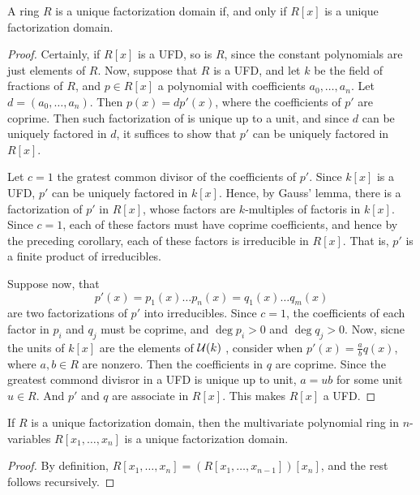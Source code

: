 \begin{theorem}\label{lemma_7.2.2}
  A ring $R$ is a unique factorization domain if, and only if  $R[x]$ is a
  unique factorization domain.
\end{theorem}
\begin{proof}
  Certainly, if $R[x]$ is a UFD, so is $R$, since the constant polynomials
  are just elements of  $R$. Now, suppose that  $R$ is a UFD, and let $k$ be
  the field of fractions of  $R$, and  $p \in R[x]$ a polynomial with
  coefficients $a_0, \dots, a_n$. Let $d=(a_0, \dots, a_n)$. Then
  $p(x)=dp'(x)$, where the coefficients of $p'$ are coprime. Then such
  factorization of is unique up to a unit, and since $d$ can be uniquely
  factored in  $d$, it suffices to show that  $p'$ can be uniquely factored in
  $R[x]$.

  Let $c=1$ the gratest common divisor of the coefficients of  $p'$. Since
  $k[x]$ is a UFD, $p'$ can be uniquely factored in  $k[x]$. Hence, by
  Gauss' lemma, there is a factorization of $p'$ in  $R[x]$, whose factors
  are $k$-multiples of factoris in $k[x]$. Since $c=1$, each of these
  factors must have coprime coefficients, and hence by the preceding
  corollary, each of these factors is irreducible in $R[x]$. That is, $p'$ is
  a finite product of irreducibles.

  Suppose now, that
  \begin{equation*}
    p'(x)=p_1(x) \dots p_n(x)=q_1(x) \dots q_m(x)
  \end{equation*}
  are two factorizations of $p'$ into irreducibles. Since  $c=1$, the
  coefficients of each factor in $p_i$ and  $q_j$ must be coprime, and
  $\deg{p_i}>0$ and $\deg{q_j}>0$. Now, sicne the units of $k[x]$ are the
  elements of $\mathcal{U}(k)$ , consider when $p'(x)=\frac{a}{b}q(x)$, where $a,b
  \in R$ are nonzero. Then the coefficients in $q$ are coprime. Since the
  greatest commond divisror in a UFD is unique up to unit,  $a=ub$ for some
  unit  $u \in R$. And  $p'$ and $q$ are associate in $R[x]$. This makes
  $R[x]$ a UFD.
\end{proof}
\begin{corollary}
  If $R$ is a unique factorization domain, then the multivariate polynomial
  ring in  $n$-variables  $R[x_1, \dots, x_n]$ is a unique factorization
  domain.
\end{corollary}
\begin{proof}
  By definition, $R[x_1, \dots, x_n]=(R[x_1, \dots, x_{n-1}])[x_n]$, and the
  rest follows recursively.
\end{proof}

